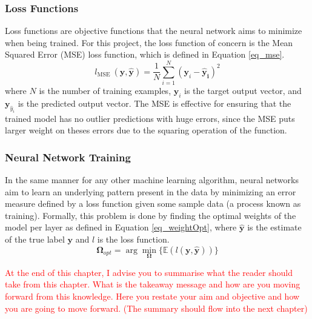  \subsubsection{Loss Functions}
 Loss functions are objective functions that the neural network aims to minimize when being
trained. For this project, the loss function of concern is the Mean Squared Error (MSE) loss function, which is defined in 
Equation \ref{eq_mse}.
\begin{equation}\label{eq_mse}
    l_\text{MSE }(\mathbf{y}, \mathbf{\hat{y}}) = \frac{1}{N} \sum_{i=1}^N (\mathbf{y}_i - \mathbf{\hat{y}_i})^2
\end{equation}\noindent where $N$ is the number of training examples, $\mathbf{y}_i$ is the target output vector, and $\mathbf{y}_{\hat{y}_i}$ is the predicted output vector.
The MSE is effective for ensuring that the trained model has no outlier predictions 
with huge errors, since the MSE puts larger weight on theses errors due to the squaring 
operation of the function.

 \subsubsection{Neural Network Training}
 In the same manner for any other machine learning algorithm, neural networks aim to learn an underlying pattern
 present in the data by minimizing an error measure defined by a loss function given some
 sample data (a process known as training). Formally, this problem is done by finding the
 optimal weights of the model per layer as defined in Equation \ref{eq_weightOpt}, where $\mathbf{\hat{y}}$ is the estimate of
 the true label $\mathbf{y}$ and $l$ is the loss function.
 \begin{equation}\label{eq_weightOpt}
    \mathbf{\Omega}_{opt} = \arg \min_{\mathbf{\Omega}} \{\mathbb{E}(l(\mathbf{y}, \mathbf{\hat{y}}))\}
 \end{equation}

\textcolor{red}{At the end of this chapter, I advise you to summarise what the reader should take from this chapter. What is the takeaway message and how are you moving forward from this knowledge. Here you restate your aim and objective and how you are going to move forward.}
\textcolor{red}{(The summary should flow into the next chapter)}

